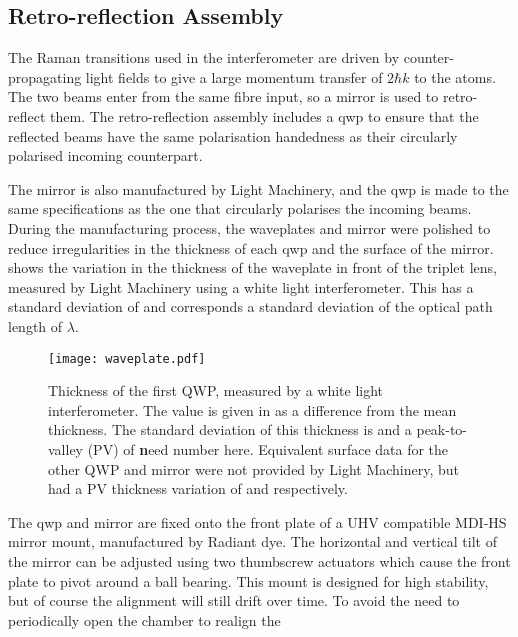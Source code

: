 		\subsection{Retro-reflection Assembly}\label{subsec:setup_ramanmirror} The
		Raman transitions used in the interferometer are driven by
		counter-propagating light fields to give a large momentum transfer of \(2
		\hbar k\) to the atoms. The two beams enter from the same fibre input, so a
		mirror is used to retro-reflect them. The retro-reflection assembly includes
		a \ac{qwp} to ensure that the reflected beams have the same polarisation
		handedness as their circularly polarised incoming counterpart. \par\noindent
		The mirror is also manufactured by Light Machinery, and the \ac{qwp} is made
		to the same specifications as the one that circularly polarises the incoming
		beams.  During the manufacturing process, the waveplates and mirror were
		polished to reduce irregularities in the thickness of each \ac{qwp} and the
		surface of the mirror.  shows the variation in
		the thickness of the waveplate in front of the triplet lens, measured by
		Light Machinery using a white light interferometer. This has a standard
		deviation of  and corresponds a standard
		deviation of the optical path length of \(\lambda\).
		\begin{figure}[!htbp] \centering
	\texttt{[image: waveplate.pdf]}
	\caption{Thickness of the first \ac{QWP}, measured by a white light
		interferometer. The value is given in \sivalue{}{\nano\metre} as a
		difference from the mean thickness. The standard deviation of this thickness
		is  and a peak-to-valley (PV) of {\textbf need
		number here}. Equivalent surface data for the other \ac{QWP} and mirror were
		not provided by Light Machinery, but had a PV thickness variation of
		 and
		 respectively.} \label{fig:waveplate_map}
\end{figure} \par\noindent The \ac{qwp} and mirror are fixed onto the front
plate of a UHV compatible MDI-HS mirror mount, manufactured by Radiant dye. The
horizontal and vertical tilt of the mirror can be adjusted using two thumbscrew
actuators which cause the front plate to pivot around a ball bearing. This mount
is designed for high stability, but of course the alignment will still drift
over time. To avoid the need to periodically open the chamber to realign the
